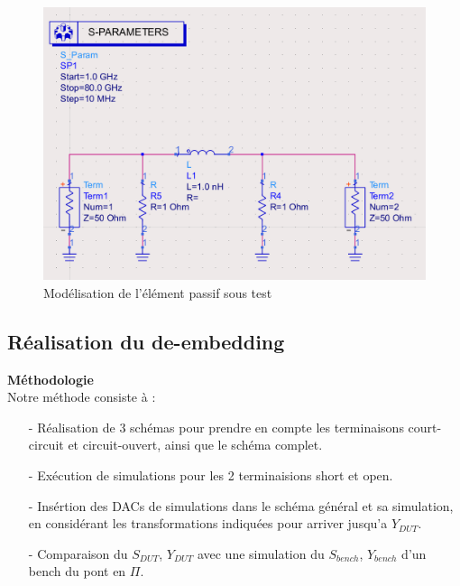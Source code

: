 \documentclass[a4paper]{article}
\begin{document}
\begin{figure}[!htb]
\begin{center}
  \includegraphics[scale=0.23]{de-embedding_bench.png}
  \caption{Mod\'elisation de l'\'el\'ement passif sous test}
  \label{de-embedding-bench}
\end{center}
\end{figure}

\subsection{R\'ealisation du de-embedding}
\textbf{M\'ethodologie}\\
Notre m\'ethode consiste \`a :
\begin{itemize}
  \item [-] R\'ealisation de 3 sch\'emas pour prendre en compte les terminaisons court-circuit et circuit-ouvert, ainsi que le sch\'ema
  complet.
  \item[-] Ex\'ecution de simulations pour les 2 terminaisions short et open.
  \item[-] Ins\'ertion des DACs de simulations dans le sch\'ema g\'en\'eral et sa simulation, en consid\'erant les transformations indiqu\'ees
  pour arriver jusqu'a $Y_{DUT}$.
  \item[-] Comparaison du $S_{DUT}$, $Y_{DUT}$ avec une simulation du $S_{bench}$, $Y_{bench}$ d'un bench du pont en $\Pi$.
\end{itemize}
\end{document}
